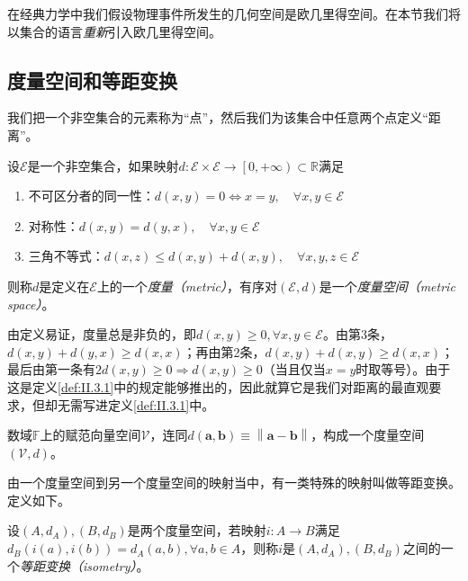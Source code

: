 \documentclass[main.tex]{subfiles}
\begin{document}
在经典力学中我们假设物理事件所发生的几何空间是欧几里得空间。在本节我们将以集合的语言\emph{重新}引入欧几里得空间。

\subsection{度量空间和等距变换}

我们把一个非空集合的元素称为“点”，然后我们为该集合中任意两个点定义“距离”。

\begin{definition}[度量空间]\label{def:II.3.1}
    设$\mathcal{E}$是一个非空集合，如果映射$d:\mathcal{E}\times\mathcal{E}\rightarrow\left[0,+\infty\right)\subset\mathbb{R}$满足
    \begin{enumerate}
        \item 不可区分者的同一性：$d\left(x,y\right)=0\Leftrightarrow x=y,\quad\forall x,y\in\mathcal{E}$
        \item 对称性：$d\left(x,y\right)=d\left(y,x\right),\quad\forall x,y\in\mathcal{E}$
        \item 三角不等式：$d\left(x,z\right)\leq d\left(x,y\right)+d\left(x,y\right),\quad\forall x,y,z\in\mathcal{E}$
    \end{enumerate}
    则称$d$是定义在$\mathcal{E}$上的一个\emph{度量（metric）}，有序对$\left(\mathcal{E},d\right)$是一个\emph{度量空间（metric space）}。
\end{definition}

由定义易证，度量总是非负的，即$d\left(x,y\right)\geq0,\forall x,y\in\mathcal{E}$。由第3条，$d\left(x,y\right)+d\left(y,x\right)\geq d\left(x,x\right)$；再由第2条，$d\left(x,y\right)+d\left(x,y\right)\geq d\left(x,x\right)$；最后由第一条有$2d\left(x,y\right)\geq0\Rightarrow d\left(x,y\right)\geq0$（当且仅当$x=y$时取等号）。由于这是定义\ref{def:II.3.1}中的规定能够推出的，因此就算它是我们对距离的最直观要求，但却无需写进定义\ref{def:II.3.1}中。

\begin{example}\label{exp:II.3.1}
    数域$\mathbb{F}$上的赋范向量空间$\mathcal{V}$，连同$d\left(\mathbf{a},\mathbf{b}\right)\equiv\left\|\mathbf{a}-\mathbf{b}\right\|$，构成一个度量空间$\left(\mathcal{V},d\right)$。
\end{example}

由一个度量空间到另一个度量空间的映射当中，有一类特殊的映射叫做等距变换。定义如下。

\begin{definition}[等距变换]\label{def:II.3.2}
    设$\left(A,d_A\right),\left(B,d_B\right)$是两个度量空间，若映射$i:A\rightarrow B$满足$d_B\left(i\left(a\right),i\left(b\right)\right)=d_A\left(a,b\right),\forall a,b\in A$，则称$i$是$\left(A,d_A\right),\left(B,d_B\right)$之间的一个\emph{等距变换（isometry）}。
\end{definition}
\end{document}
